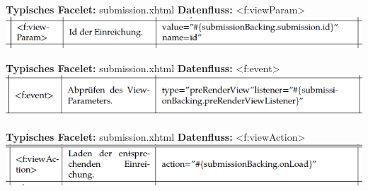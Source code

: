 \documentclass{beamer}
\begin{document}
    \begin{frame}{\textbf{Typisches Facelet:} submission.xhtml}
        \textbf{Datenfluss:} <f:viewParam>
        \newline\newline
        \centering
        \includegraphics[height=0.1\textheight]{graphics/facelet/fac_viewParam}
    \end{frame}
    \begin{frame}{\textbf{Typisches Facelet:} submission.xhtml}
        \textbf{Datenfluss:} <f:event>
        \newline\newline
        \centering
        \includegraphics[height=0.1\textheight]{graphics/facelet/fac_event}
    \end{frame}
    \begin{frame}{\textbf{Typisches Facelet:} submission.xhtml}
        \textbf{Datenfluss:} <f:viewAction>
        \newline\newline
        \centering
        \includegraphics[height=0.1\textheight]{graphics/facelet/fac_onLoad}
    \end{frame}
\end{document}
